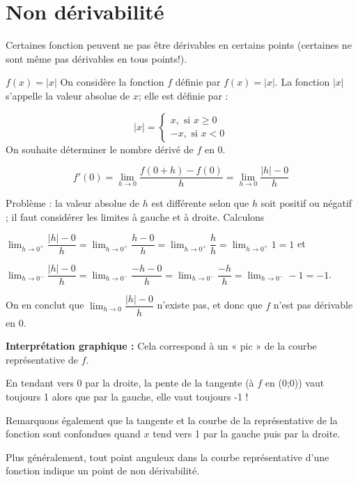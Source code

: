 \documentclass[a4paper,12pt]{article}
\begin{document}
\section{Non dérivabilité}
\begin{autre}
	\tcblower
Certaines fonction peuvent ne pas être dérivables en certains points (certaines ne sont même pas dérivables en tous points!).
\end{autre}
\begin{exemple}
	$f(x)=|x|$
	\tcblower
On considère la fonction $f$ définie par $f(x)=|x|$.
La fonction $|x|$ s'appelle la valeur absolue de $x$; elle est définie par : 

\[|x|=\begin{cases} x, \text{ si } x \geq 0 \\ -x, \text{ si } x<0 \end{cases}\]
On souhaite déterminer le nombre dérivé de $f$ en $0$. 

\[f'(0)=\displaystyle\lim_{h \to 0} \dfrac{f(0+h)-f(0)}{h}=\displaystyle\lim_{h \to 0} \dfrac{|h|-0}{h}\]

Problème : la valeur absolue de $h$ est différente selon que $h$ soit positif ou négatif ; il faut considérer les limites à gauche et à droite. Calculons

$\displaystyle\lim_{h \to 0^+} \dfrac{|h|-0}{h}=\displaystyle\lim_{h \to 0^+} \dfrac{h-0}{h}=\displaystyle\lim_{h \to 0^+} \dfrac{h}{h}=\displaystyle\lim_{h \to 0^+} 1=1$ et

$\displaystyle\lim_{h \to 0^-} \dfrac{|h|-0}{h}=\displaystyle\lim_{h \to 0^-} \dfrac{-h-0}{h}=\displaystyle\lim_{h \to 0^-} \dfrac{-h}{h}=\displaystyle\lim_{h \to 0^-} -1=-1$.

\end{exemple}
\begin{exemplesuite}
	\tcblower
On en conclut que $\displaystyle\lim_{h \to 0} \dfrac{|h|-0}{h}$ n'existe pas, et donc que $f$ n'est pas dérivable en 0.

{\bfseries Interprétation graphique :} Cela correspond à un « pic » de la courbe représentative de $f$.

En tendant vers 0 par la droite, la pente de la tangente (à $f$ en (0;0)) vaut toujours 1 alors que par la gauche, elle vaut toujours -1 !

Remarquons également que la tangente et la courbe de la représentative de la fonction sont confondues quand $x$ tend vers 1 par la gauche puis par la droite.
\end{exemplesuite}
\begin{remarque}
\tcblower	
Plus généralement, tout point anguleux dans la courbe représentative d'une fonction indique un point de non dérivabilité.
\end{remarque}
\end{document}
